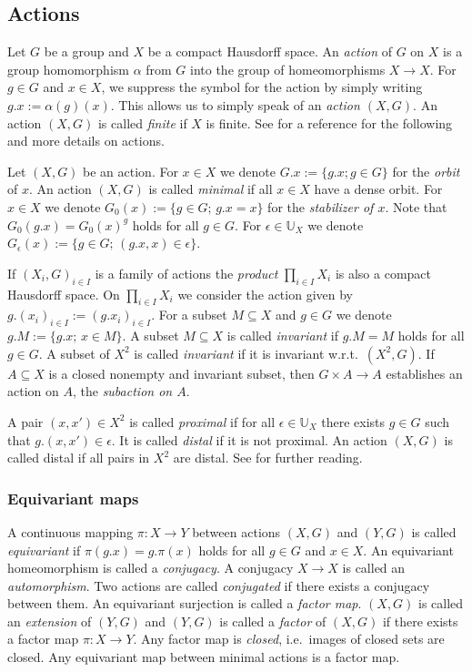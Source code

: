 \documentclass[12pt, reqno]{amsart}
\theoremstyle{definition}
\theoremstyle{remark}
\numberwithin{equation}{section}
\theoremstyle{theorem}
\theoremstyle{remark}
\begin{document}
\subsection{Actions}
\label{subsec:prelims_actions}
Let $G$ be a group and $X$ be a compact Hausdorff space. 
An \emph{action} of $G$ on $X$ is a group homomorphism $\alpha$ from $G$ into the group of homeomorphisms $X\to X$.
For $g\in G$ and $x\in X$, we suppress the symbol for the action by simply writing $g.x:=\alpha(g)(x)$. 
This allows us to simply speak of an \emph{action $(X,G)$}. 
An action $(X,G)$ is called \emph{finite} if $X$ is finite.
See \cite{auslander1988minimal} for a reference for the following and more details on actions.  

Let $(X,G)$ be an action. 
For $x\in X$ we denote $G.x:=\{g.x; g\in G\}$ for the \emph{orbit} of $x$. An action $(X,G)$ is called \emph{minimal} if all $x\in X$ have a dense orbit. 
For $x\in X$ we denote $G_0(x):=\{g\in G;\, g.x=x\}$ for the \emph{stabilizer of $x$}. 
Note that $G_0(g.x)=G_0(x)^g$ holds for all $g\in G$.
For $\epsilon\in \mathbb{U}_X$ we denote $G_\epsilon(x):=\{g\in G;\, (g.x,x)\in \epsilon\}$. 

If $(X_i,G)_{i\in I}$ is a family of actions the \emph{product} $\prod_{i\in I} X_i$ is also a compact Hausdorff space. 
On $\prod_{i\in I} X_i$ we consider the action given by $g.(x_i)_{i\in I}:=(g.x_i)_{i\in I}$. 
For a subset $M\subseteq X$ and $g\in G$ we denote $g.M:=\{g.x;\, x\in M\}$. 
A subset $M\subseteq X$ is called \emph{invariant} if $g.M=M$ holds for all $g\in G$. 
A subset of $X^2$ is called \emph{invariant} if it is invariant w.r.t.\ $(X^2,G)$. 
If $A\subseteq X$ is a closed nonempty and invariant subset, then 
$G\times A\to A$ establishes an action on $A$, the \emph{subaction on $A$}. 

A pair $(x,x')\in X^2$ is called \emph{proximal} if for all $\epsilon\in \mathbb{U}_X$ there exists $g\in G$ such that $g.(x,x')\in \epsilon$. 
It is called \emph{distal} if it is not proximal. 
An action $(X,G)$ is called distal if all pairs in $X^2$ are distal.
See \cite{auslander1988minimal} for further reading. 


\subsubsection{Equivariant maps}
\label{subsubsec:prelims_actions_EquivariantMaps}
A continuous mapping $\pi\colon X\to Y$ between actions $(X,G)$ and $(Y,G)$ is called \emph{equivariant} if $\pi(g.x)=g.\pi(x)$ holds for all $g\in G$ and $x\in X$. 
An equivariant homeomorphism is called a \emph{conjugacy}. 
A conjugacy $X\to X$ is called an \emph{automorphism}. 
Two actions are called \emph{conjugated} if there exists a conjugacy between them. 
An equivariant surjection is called a \emph{factor map}. 
$(X,G)$ is called an \emph{extension} of $(Y,G)$ and $(Y,G)$ is called a \emph{factor} of $(X,G)$ if there exists a factor map $\pi\colon X\to Y$. 
Any factor map is \emph{closed}, i.e.\ images of closed sets are closed. 
Any equivariant map between minimal actions is a factor map. 
\end{document}
